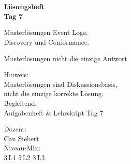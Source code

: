 \documentclass[11pt,a4paper,oneside]{article}
\begin{document}
\begin{titlepage}
  \pagestyle{empty}
  \vspace*{1.5cm}
  \\[2pt]
  \noindent{\color{lpAccent}\rule{\linewidth}{1.2pt}}\\[4pt]

  \vspace{3cm}
  {\sffamily\fontsize{30}{34}\selectfont\bfseries\color{lpInk}L\"osungsheft\\Tag 7\par}

  \vspace{0.7cm}
  {\sffamily\large\color{lpGray}Musterl\"osungen \textendash{} Event Logs,\\Discovery und Conformance.\par}

  \vspace{1.5cm}
  {\caveatfont\LARGE\color{lpGreen}Musterl\"osungen \textperiodcentered{} nicht die einzige Antwort}\par

  \vfill

  \noindent\begin{minipage}{0.55\linewidth}
    {\sffamily\footnotesize\color{lpGray}Hinweis:}\\
    {\sffamily\small\color{lpInk}Musterl\"osungen sind Diskussionsbasis,\\nicht die einzige korrekte L\"osung.}\\[10pt]
    {\sffamily\footnotesize\color{lpGray}Begleitend:}\\
    {\sffamily\small\color{lpInk}Aufgabenheft \& Lehrskript Tag 7}
  \end{minipage}\hfill
  \begin{minipage}{0.4\linewidth}
    \raggedleft
    {\sffamily\footnotesize\color{lpGray}Dozent:}\\
    {\sffamily\small\color{lpInk}Can Siebert}\\[10pt]
    {\sffamily\footnotesize\color{lpGray}Niveau-Mix:}\\
    {\sffamily\small\color{lpInk}3\,L1 \textperiodcentered{} 5\,L2 \textperiodcentered{} 3\,L3}
  \end{minipage}

  \vspace{0.5cm}
  \noindent{\color{lpAccent}\rule{\linewidth}{0.6pt}}
\end{titlepage}
\end{document}
